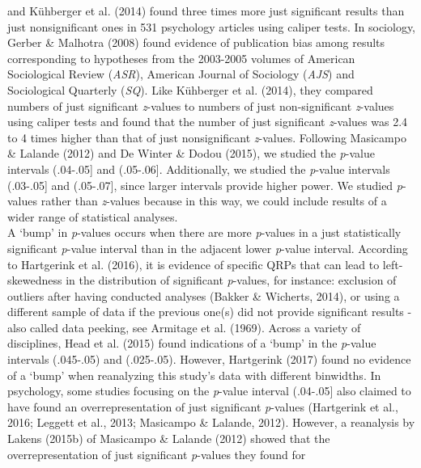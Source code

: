 \documentclass[
  12pt,
]{article}
\begin{document}
and Kühberger et al. (2014) found three times more just significant
results than just nonsignificant ones in 531 psychology articles using
caliper tests. In sociology, Gerber \& Malhotra (2008) found evidence of
publication bias among results corresponding to hypotheses from the
2003-2005 volumes of American Sociological Review (\emph{ASR}), American
Journal of Sociology (\emph{AJS}) and Sociological Quarterly
(\emph{SQ}). Like Kühberger et al. (2014), they compared numbers of just
significant \emph{z}-values to numbers of just non-significant
\emph{z}-values using caliper tests and found that the number of just
significant \emph{z}-values was 2.4 to 4 times higher than that of just
nonsignificant \emph{z}-values. Following Masicampo \& Lalande (2012)
and De Winter \& Dodou (2015), we studied the \emph{p}-value intervals
(.04-.05{]} and (.05-.06{]}. Additionally, we studied the \emph{p}-value
intervals (.03-.05{]} and (.05-.07{]}, since larger intervals provide
higher power. We studied \emph{p}-values rather than \emph{z}-values
because in this way, we could include results of a wider range of
statistical analyses.\\
\hspace*{0.333em}\hspace*{0.333em}\hspace*{0.333em}\hspace*{0.333em}A
`bump' in \emph{p}-values occurs when there are more \emph{p}-values in
a just statistically significant \emph{p}-value interval than in the
adjacent lower \emph{p}-value interval. According to Hartgerink et al.
(2016), it is evidence of specific QRPs that can lead to left-skewedness
in the distribution of significant \emph{p}-values, for instance:
exclusion of outliers after having conducted analyses (Bakker \&
Wicherts, 2014), or using a different sample of data if the previous
one(s) did not provide significant results - also called data peeking,
see Armitage et al. (1969). Across a variety of disciplines, Head et al.
(2015) found indications of a `bump' in the \emph{p}-value intervals
(.045-.05) and (.025-.05). However, Hartgerink (2017) found no evidence
of a `bump' when reanalyzing this study's data with different binwidths.
In psychology, some studies focusing on the \emph{p}-value interval
(.04-.05{]} also claimed to have found an overrepresentation of just
significant \emph{p}-values (Hartgerink et al., 2016; Leggett et al.,
2013; Masicampo \& Lalande, 2012). However, a reanalysis by Lakens
(2015b) of Masicampo \& Lalande (2012) showed that the
overrepresentation of just significant \emph{p}-values they found for
\end{document}
